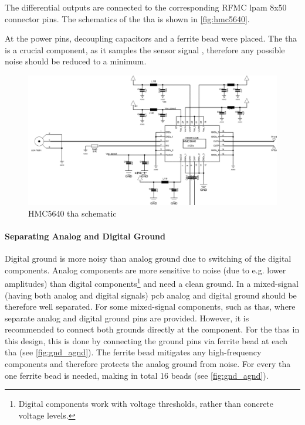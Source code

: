 The differential outputs are connected to the corresponding RFMC \gls{lpam} 8x50 connector pins.
The schematics of the \gls{tha} is shown in \autoref{fig:hmc5640}.

At the power pins, decoupling capacitors and a ferrite bead  were placed. The \gls{tha} is a crucial component, as it samples the sensor signal , therefore any possible noise should be reduced to a minimum.


\begin{figure}[tb]
	\centering
	\includegraphics[width = \textwidth]{chap/04-theresa/img/schematic/hmc5640}
	\caption[HMC5640 THA schematic]{HMC5640 \gls{tha} schematic}
	\label{fig:hmc5640}
\end{figure}
\paragraph{Separating Analog and Digital Ground}
Digital ground is more noisy than analog ground due to switching of the digital components. 
Analog components are more sensitive to noise (due to e.g. lower amplitudes) than digital components\footnote{Digital components work with voltage thresholds, rather than concrete voltage levels.} and need a clean ground.
In a mixed-signal (having both analog and digital signals) \gls{pcb} analog and digital ground should be therefore well separated.
For some mixed-signal components, such as \glspl{tha}, where separate analog and digital ground pins are provided.
However, it is recommended to connect both grounds directly at the component.
For the \glspl{tha} in this design, this is done by connecting the ground pins via ferrite bead at each \gls{tha} (see \autoref{fig:gnd_agnd}). 
The ferrite bead mitigates any high-frequency components and therefore protects the analog ground from noise.
For every \gls{tha} one ferrite bead is needed, making in total 16 beads (see \autoref{fig:gnd_agnd}).

